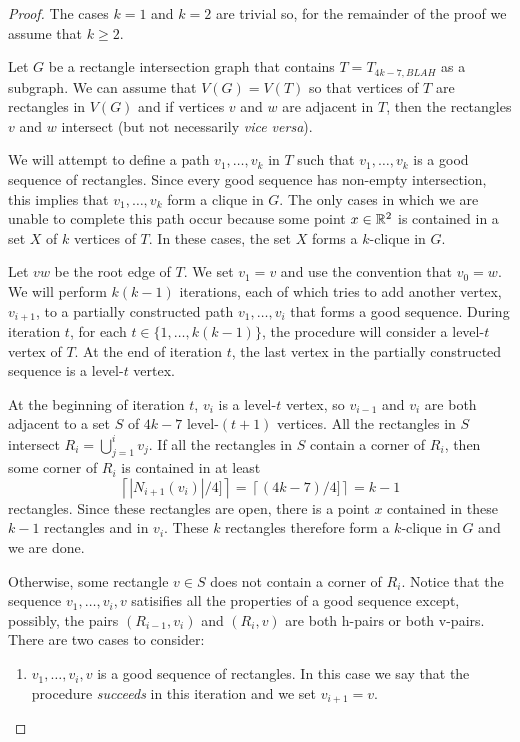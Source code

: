 \documentclass[lotsofwhite]{patmorin}
\begin{document}
\begin{proof}
  The cases $k=1$ and $k=2$ are trivial so, for the remainder of the proof
  we assume that $k\ge 2$.

  Let $G$ be a rectangle intersection graph that contains
  $T=T_{4k-7,BLAH}$ as a subgraph.  We can assume that $V(G)=V(T)$
  so that vertices of $T$ are rectangles in $V(G)$ and if vertices $v$
  and $w$ are adjacent in $T$, then the rectangles $v$ and $w$ intersect
  (but not necessarily \emph{vice versa}).  

  We will attempt to define a path $v_1,\ldots,v_k$ in $T$ such that
  $v_1,\ldots,v_k$ is a good sequence of rectangles. Since every good
  sequence has  non-empty intersection, this implies that $v_1,\ldots,v_k$
  form a clique in $G$.  The only cases in which we are unable to
  complete this path occur because some point $x\in\mathbb{R}^2$ is contained
  in a set $X$ of $k$ vertices of $T$.  In these cases, the set $X$
  forms a $k$-clique in $G$.

  Let $vw$ be the root edge of $T$. We set $v_1=v$ and use the convention
  that $v_0=w$.  We will perform $k(k-1)$ iterations, each of which
  tries to add another vertex, $v_{i+1}$, to a partially constructed
  path $v_1,\ldots,v_i$ that forms a good sequence.  During iteration
  $t$, for each $t\in\{1,\ldots,k(k-1)\}$, the procedure will consider a
  level-$t$ vertex of $T$.  At the end of iteration $t$, the last vertex
  in the partially constructed sequence is a level-$t$ vertex.

  At the beginning of iteration $t$, $v_i$ is a level-$t$ vertex,
  so $v_{i-1}$ and $v_i$ are both adjacent to a set $S$ of $4k-7$
  level-$(t+1)$ vertices.  All the rectangles in $S$ intersect
  $R_i=\bigcup_{j=1}^i v_j$.  If all the rectangles in $S$ contain a
  corner of $R_i$, then some corner of $R_i$ is contained in at least
  \[  \left\lceil |N_{i+1}(v_i)|/4]\right\rceil 
         = \left\lceil(4k-7)/4]\right\rceil = k-1
  \]
  rectangles.  Since these rectangles are open, there is a point $x$
  contained in these $k-1$ rectangles and in $v_{i}$.  These $k$
  rectangles therefore form a $k$-clique in $G$ and we are done.

  Otherwise, some rectangle $v\in S$ does not contain a corner of $R_i$.
  Notice that the sequence $v_1,\ldots,v_i,v$ satisifies all the
  properties of a good sequence except, possibly, the pairs $(R_{i-1},v_i)$
  and $(R_i,v)$ are both h-pairs or both v-pairs.  There are two cases
  to consider:
  \begin{enumerate}
     \item $v_1,\ldots,v_i,v$ is a good sequence of rectangles. In this
       case we say that the procedure \emph{succeeds} in this iteration
       and we set $v_{i+1}=v$.


\end{enumerate}
\end{proof}
\end{document}

